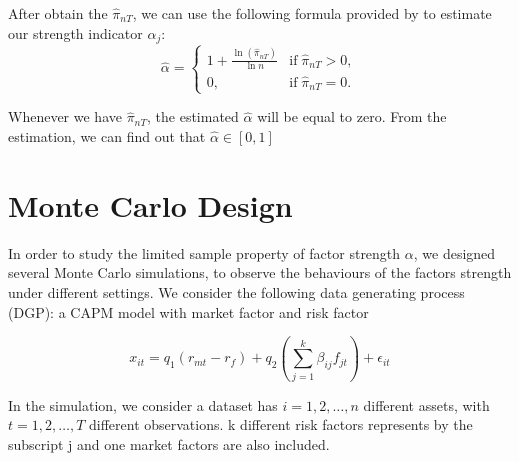 \documentclass[12pt]{article}
\begin{document}
After obtain the $\hat{\pi}_{nT}$, we can use the following formula provided by  to estimate our strength indicator $\alpha_j$:
\[ \hat{\alpha} = \begin{cases}
1+\frac{\ln(\hat{\pi}_{nT})}{\ln n} & \text{if}\; \hat{\pi}_{nT} > 0,\\
0, & \text{if}\; \hat{\pi}_{nT} = 0.
\end{cases} \]

Whenever we have $\hat{\pi}_{nT}$, the estimated $\hat{\alpha}$ will be equal to zero. 
From the estimation, we can find out that $\hat{\alpha} \in [0,1]$



	\section{Monte Carlo Design}\label{MC}
In order to study the limited sample property of factor strength $\alpha$, we designed several Monte Carlo simulations, to observe the behaviours of the factors strength under different settings. 
We consider the following data generating process (DGP): a CAPM model with market factor and risk factor

\[ x_{it} = q_1({r_{mt}} - r_f) + q_2( \sum_{j=1}^k\beta_{ij}f_{jt}) +\epsilon_{it}  \]

In the simulation, we consider a dataset has $i = 1, 2,\dots, n$ different assets, with $t= 1, 2,\dots, T$ different observations. 
k different risk factors represents by the subscript j and one market factors are also included.
\end{document}
